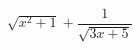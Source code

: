 \hspace*{2mm}\begin{minipage}[t]{\dimexpr\linewidth-2mm\relax}\vspace{0pt}
$\sqrt{x^2+1}+\dfrac{1}{\sqrt{3x+5}}$\end{minipage}
